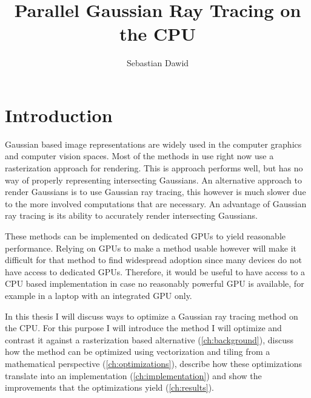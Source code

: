 \documentclass[a4paper, 11pt]{memoir}
\title{Parallel Gaussian Ray Tracing on the CPU}
\author{Sebastian Dawid}
\begin{document}
    \frontmatter
    \smarttitle
    \newpage
    \tableofcontents*

    \clearpage
    \thispagestyle{abs}
    \abstractintoc
    \begin{abstract}
        \lipsum[1]
    \end{abstract}

    \mainmatter
    \chapter{Introduction}
    Gaussian based image representations are widely used in the computer graphics and computer vision spaces. Most of
    the methods in use right now use a rasterization approach for rendering. This is approach performs well, but has no
    way of properly representing intersecting Gaussians. An alternative approach to render Gaussians is to use Gaussian
    ray tracing, this however is much slower due to the more involved computations that are necessary. An advantage of
    Gaussian ray tracing is its ability to accurately render intersecting Gaussians.

    These methods can be implemented on dedicated GPUs to yield reasonable performance. Relying on GPUs to make a method
    usable however will make it difficult for that method to find widespread adoption since many devices do not have
    access to dedicated GPUs. Therefore, it would be useful to have access to a CPU based implementation in case no reasonably
    powerful GPU is available, for example in a laptop with an integrated GPU only.

    In this thesis I will discuss ways to optimize a Gaussian ray tracing method on the CPU. For this purpose I will
    introduce the method I will optimize and contrast it against a rasterization based alternative (\ref{ch:background}),
    discuss how the method can be optimized using vectorization and tiling from a mathematical perspective
    (\ref{ch:optimizations}), describe how these optimizations translate into an implementation (\ref{ch:implementation})
    and show the improvements that the optimizations yield (\ref{ch:results}).

\end{document}

